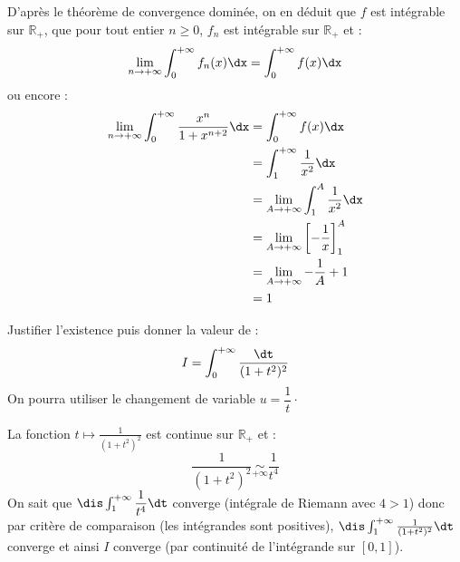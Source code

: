 \documentclass[a4paper,10pt]{report}
\begin{document}
D'après le théorème de convergence dominée, on en déduit que $f$ est intégrable sur $\mathbb{R}_+$, que pour tout entier $n \geq 0$, $f_n$ est intégrable sur $\mathbb{R}_+$ et :
$$ \lim_{n \rightarrow + \infty} \int_0^{+ \infty} f_n(x) \dx = \int_0^{+ \infty} f(x) \dx$$
ou encore :
\begin{align*}
\lim_{n \rightarrow + \infty} \int_0^{+ \infty} \dfrac{x^n}{1+x^{n+2}} \dx & = \int_0^{+ \infty} f(x) \dx \\
& = \int_1^{+ \infty} \dfrac{1}{x^2} \dx \\
& = \lim_{A \rightarrow + \infty} \int_1^{A} \dfrac{1}{x^2} \dx \\
& = \lim_{A \rightarrow + \infty} \left[ - \dfrac{1}{x} \right]_1^A \\
& = \lim_{A \rightarrow + \infty} - \dfrac{1}{A} + 1 \\
& = 1
\end{align*}


\begin{Exercice}{} Justifier l'existence puis donner la valeur de :
  \[
  I = \int_{0}^{ + \infty} \frac{\dt}{(1 + t^{2})^{2}}
  \]
On pourra utiliser le changement de variable $u = \dfrac{1}{t} \cdot$
\end{Exercice}

\corr La fonction $t \mapsto \frac{1}{(1 + t^{2})^{2}}$ est continue sur $\mathbb{R}_+$ et :
$$ \frac{1}{(1 + t^{2})^{2}} \underset{+ \infty}{\sim} \dfrac{1}{t^4}$$
On sait que $\dis \int_1^{+ \infty} \dfrac{1}{t^4} \dt$ converge (intégrale de Riemann avec $4>1$) donc par critère de comparaison (les intégrandes sont positives), $\dis  \int_1^{+ \infty}  \frac{1}{(1 + t^{2})^{2}} \dt$ converge et ainsi $I$ converge (par continuité de l'intégrande sur $[0,1]$).

\medskip
\end{document}
